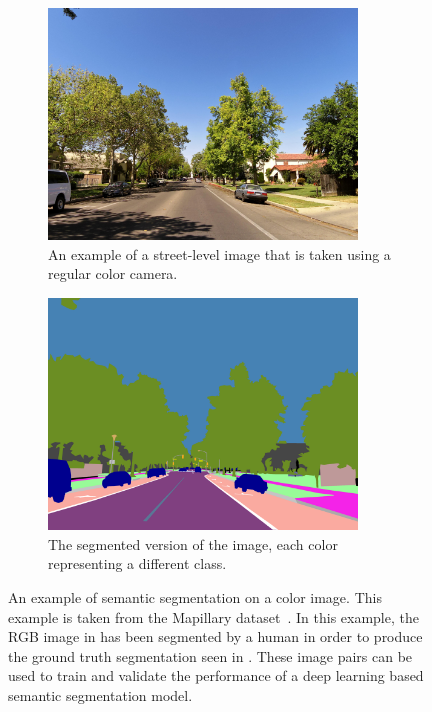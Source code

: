 \begin{figure}[t]
    \centering
    \begin{subfigure}{0.45\textwidth}
    	\centering
    	\includegraphics[width=0.9\textwidth]{figures/background/raw.jpg} %
    	\caption{An example of a street-level image that is taken using a regular color camera.} \label{fig:background-raw}
    \end{subfigure}
	\hfill
    \begin{subfigure}{0.45\textwidth}
        \centering
        \includegraphics[width=0.9\textwidth]{figures/background/segmented.png} %
        \caption{The segmented version of the image, each color representing a different class.} \label{fig:background-segmented}
    \end{subfigure}
	\caption[An example of semantic segmentation.]{An example of semantic segmentation on a color image. This example is taken from the Mapillary dataset~\cite{mapillary}. In this example, the RGB image in  has been segmented by a human in order to produce the ground truth segmentation seen in . These image pairs can be used to train and validate the performance of a deep learning based semantic segmentation model.}
\end{figure}